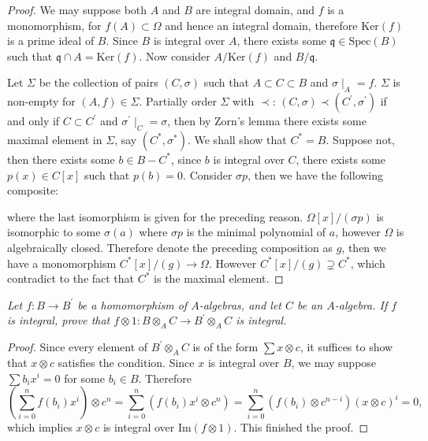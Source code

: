 \begin{proof}
We may suppose both $A$ and $B$ are integral domain, and $f$ is a monomorphism, for $f(A)\subset\Omega$ and hence an integral domain, therefore $\mathrm{Ker}(f)$ is a prime ideal of $B$. Since $B$ is integral over $A$, there exists some $\mathfrak{q}\in\mathrm{Spec}(B)$ such that $\mathfrak{q}\cap A=\mathrm{Ker}(f)$. Now consider $A/\mathrm{Ker}(f)$ and $B/\mathfrak{q}$.\par
Let $\Sigma$ be the collection of pairs $(C,\sigma)$ such that $A\subset C\subset B$ and $\sigma\mid_A=f$. $\Sigma$ is non-empty for $(A,f)\in\Sigma$. Partially order $\Sigma$ with $\prec$: $(C,\sigma)\prec(C^\prime,\sigma^\prime)$ if and only if $C\subset C^\prime$ and $\sigma^\prime\mid_C=\sigma$, then by Zorn's lemma there exists some maximal element in $\Sigma$, say $(C^*,\sigma^*)$. We shall show that $C^*=B$. Suppose not, then there exists some $b\in B-C^*$, since $b$ is integral over $C$, there exists some $p(x)\in C[x]$ such that $p(b)=0$. Consider $\sigma p$, then we have the following composite: 
\begin{center}
\end{center}
where the last isomorphism is given for the preceding reason. $\Omega[x]/(\sigma p)$ is isomorphic to some $\sigma(a)$ where $\sigma p$ is the minimal polynomial of $a$, however $\Omega$ is algebraically closed. Therefore denote the preceding composition as $g$, then we have a monomorphism $C^*[x]/(g)\to\Omega$. However $C^*[x]/(g)\supsetneq C^*$, which contradict to the fact that $C^*$ is the maximal element.
\end{proof}
\begin{problem}\em
Let $f:B\to B^\prime$ be a homomorphism of $A$-algebras, and let $C$ be an $A$-algebra. If $f$ is integral, prove that $f\otimes 1:B\otimes_AC\to B^\prime\otimes_AC$ is integral.
\end{problem}
\begin{proof}
Since every element of $B^\prime\otimes_AC$ is of the form $\sum x\otimes c$, it suffices to show that $x\otimes c$ satisfies the condition. Since $x$ is integral over $B$, we may suppose $\sum b_ix^i=0$ for some $b_i\in B$. Therefore 
$$
\left( \sum_{i=0}^n{f\left( b_i \right) x^i} \right) \otimes c^n=\sum_{i=0}^n{\left( f\left( b_i \right) x^i\otimes c^n \right)}=\sum_{i=0}^n{\left( f\left( b_i \right) \otimes c^{n-i} \right) \left( x\otimes c \right) ^i}=0,
$$
which implies $x\otimes c$ is integral over $\mathrm{Im}(f\otimes 1)$. This finished the proof.
\end{proof}
